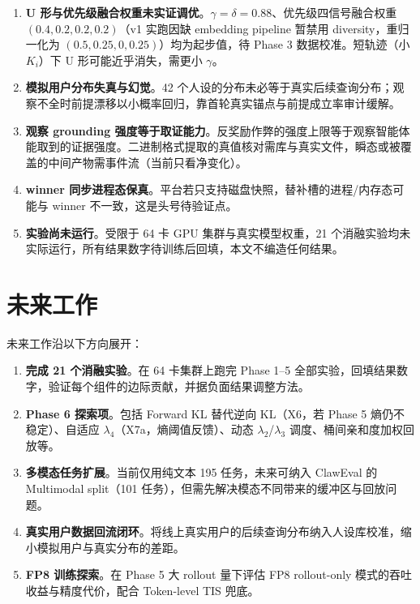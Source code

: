 \begin{enumerate}
  \item \textbf{U 形与优先级融合权重未实证调优}。$\gamma=\delta=0.88$、优先级四信号融合权重 $(0.4,0.2,0.2,0.2)$（v1 实跑因缺 embedding pipeline 暂禁用 diversity，重归一化为 $(0.5,0.25,0,0.25)$）均为起步值，待 Phase 3 数据校准。短轨迹（小 $K_i$）下 U 形可能近乎消失，需更小 $\gamma$。
  \item \textbf{模拟用户分布失真与幻觉}。42 个人设的分布未必等于真实后续查询分布；观察不全时前提漂移以小概率回归，靠首轮真实锚点与前提成立率审计缓解。
  \item \textbf{观察 grounding 强度等于取证能力}。反奖励作弊的强度上限等于观察智能体能取到的证据强度。二进制格式提取的真值核对需库与真实文件，瞬态或被覆盖的中间产物需事件流（当前只看净变化）。
  \item \textbf{winner 同步进程态保真}。平台若只支持磁盘快照，替补槽的进程/内存态可能与 winner 不一致，这是头号待验证点。
  \item \textbf{实验尚未运行}。受限于 64 卡 GPU 集群与真实模型权重，21 个消融实验均未实际运行，所有结果数字待训练后回填，本文不编造任何结果。
\end{enumerate}

\section{未来工作}
\label{sec:concl-future}

未来工作沿以下方向展开：

\begin{enumerate}
  \item \textbf{完成 21 个消融实验}。在 64 卡集群上跑完 Phase 1--5 全部实验，回填结果数字，验证每个组件的边际贡献，并据负面结果调整方法。
  \item \textbf{Phase 6 探索项}。包括 Forward KL 替代逆向 KL（X6，若 Phase 5 熵仍不稳定）、自适应 $\lambda_4$（X7a，熵阈值反馈）、动态 $\lambda_2$/$\lambda_3$ 调度、桶间亲和度加权回放等。
  \item \textbf{多模态任务扩展}。当前仅用纯文本 195 任务，未来可纳入 ClawEval 的 Multimodal split（101 任务），但需先解决模态不同带来的缓冲区与回放问题。
  \item \textbf{真实用户数据回流闭环}。将线上真实用户的后续查询分布纳入人设库校准，缩小模拟用户与真实分布的差距。
  \item \textbf{FP8 训练探索}。在 Phase 5 大 rollout 量下评估 FP8 rollout-only 模式的吞吐收益与精度代价，配合 Token-level TIS 兜底。
\end{enumerate}
